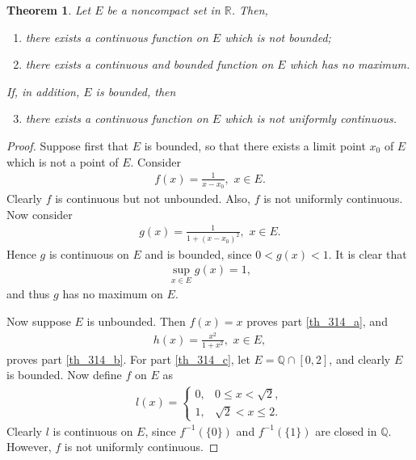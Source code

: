 \documentclass[10pt]{book}
\newtheorem{theorem}{Theorem}[chapter]
\theoremstyle{definition}
\numberwithin{equation}{chapter}
\begin{document}
\medskip

\begin{theorem}\label{th_314}
Let $E$ be a noncompact set in $\mathbb{R}$. Then,
\begin{enumerate}[label=(\alph*)]
    \item there exists a continuous function on $E$ which is not bounded; \label{th_314_a}
    
    \item there exists a continuous and bounded function on $E$ which has no maximum. \label{th_314_b}
\end{enumerate}
If, in addition, $E$ is bounded, then
\begin{enumerate}[label=(\alph*)]
    \setcounter{enumi}{2}
    \item there exists a continuous function on $E$ which is not uniformly continuous. \label{th_314_c}
\end{enumerate}
\end{theorem}
\begin{proof}
Suppose first that $E$ is bounded, so that there exists a limit point $x_0$ of $E$ which is not a point of $E$. Consider
\begin{align*}
    f(x) = \frac{1}{x - x_0}, \,\, x \in E.
\end{align*}
Clearly $f$ is continuous but not unbounded. Also, $f$ is not uniformly continuous. Now consider 
\begin{align*}
    g(x) = \frac{1}{1 + (x - x_0)^2}, \,\, x \in E.
\end{align*}
Hence $g$ is continuous on $E$ and is bounded, since $0 < g(x) < 1$. It is clear that
\begin{align*}
    \sup_{x\in E} g(x) = 1,
\end{align*}
and thus $g$ has no maximum on $E$. 

Now suppose $E$ is unbounded. Then $f(x) = x$ proves part \ref{th_314_a}, and 
\begin{align*}
    h(x) = \frac{x^2}{1 + x^2}, \,\, x \in E,
\end{align*}
proves part \ref{th_314_b}. For part \ref{th_314_c}, let $E = \mathbb{Q} \cap [0,2]$, and clearly $E$ is bounded. Now define $f$ on $E$ as
\begin{align*}
    l(x) = \begin{cases}
        0, & 0 \leq x < \sqrt{2}, \\
        1, & \sqrt{2} < x \leq 2.
    \end{cases}
 \end{align*}
Clearly $l$ is continuous on $E$, since $f^{-1}(\{0\})$ and $f^{-1}(\{1\})$ are closed in $\mathbb{Q}$. However, $f$ is not uniformly continuous.
\end{proof}
\end{document}
